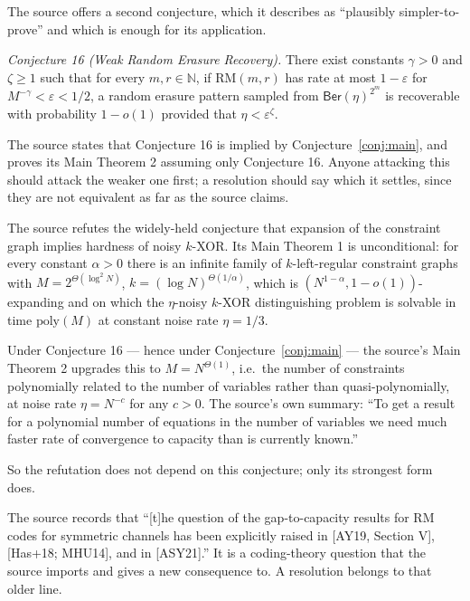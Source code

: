 \documentclass{aicr-conjecture}
\newcommand{\eps}{\varepsilon}
\newcommand{\RM}{\mathrm{RM}}
\newcommand{\Ber}{\mathsf{Ber}}
\begin{document}
\begin{remark}\label{rem:weak}
The source offers a second conjecture, which it describes as ``plausibly
simpler-to-prove'' and which is enough for its application.

\emph{Conjecture 16 (Weak Random Erasure Recovery).} There exist
constants $\gamma > 0$ and $\zeta \ge 1$ such that for every $m, r \in
\mathbb{N}$, if $\RM(m,r)$ has rate at most $1 - \eps$ for
$M^{-\gamma} < \eps < 1/2$, a random erasure pattern sampled from
$\Ber(\eta)^{2^{m}}$ is recoverable with probability $1 - o(1)$ provided
that $\eta < \eps^{\zeta}$.

The source states that Conjecture 16 is implied by
Conjecture~\ref{conj:main}, and proves its Main Theorem 2 assuming only
Conjecture 16. Anyone attacking this should attack the weaker one first;
a resolution should say which it settles, since they are not equivalent
as far as the source claims.
\end{remark}

\begin{remark}\label{rem:payoff}
The source refutes the widely-held conjecture that expansion of the
constraint graph implies hardness of noisy $k$-XOR\@. Its Main Theorem 1 is
unconditional: for every constant $\alpha > 0$ there is an infinite
family of $k$-left-regular constraint graphs with
$M = 2^{\Theta(\log^{2} N)}$, $k = (\log N)^{\Theta(1/\alpha)}$, which is
$(N^{1-\alpha}, 1-o(1))$-expanding and on which the $\eta$-noisy $k$-XOR
distinguishing problem is solvable in time $\mathrm{poly}(M)$ at constant
noise rate $\eta = 1/3$.

Under Conjecture 16 --- hence under Conjecture~\ref{conj:main} --- the
source's Main Theorem 2 upgrades this to $M = N^{\Theta(1)}$, i.e.\ the
number of constraints polynomially related to the number of variables
rather than quasi-polynomially, at noise rate $\eta = N^{-c}$ for any $c
> 0$. The source's own summary: ``To get a result for a polynomial number
of equations in the number of variables we need much faster rate of
convergence to capacity than is currently known.''

So the refutation does not depend on this conjecture; only its strongest
form does.
\end{remark}

\begin{remark}\label{rem:attribution}
The source records that ``[t]he question of the gap-to-capacity results
for RM codes for symmetric channels has been explicitly raised in [AY19,
Section V], [Has+18; MHU14], and in [ASY21].'' It is a coding-theory
question that the source imports and gives a new consequence to. A
resolution belongs to that older line.
\end{remark}
\end{document}
